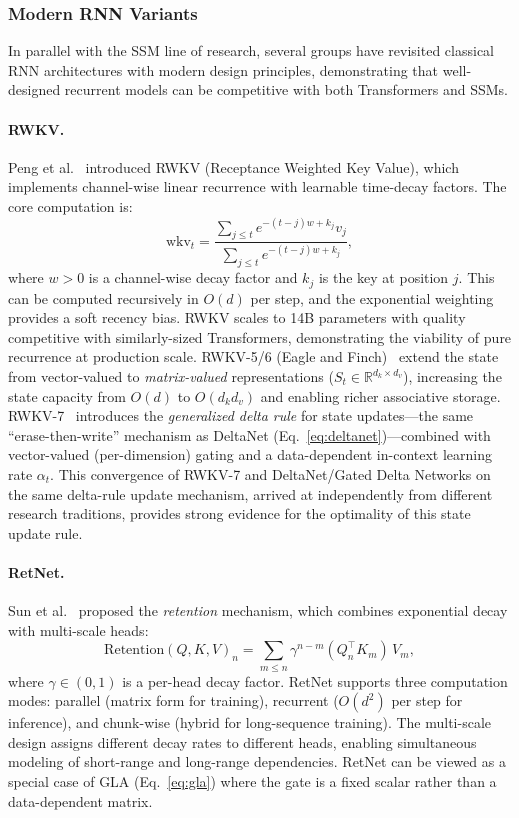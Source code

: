 \subsubsection{Modern RNN Variants}
\label{subsubsec:modern-rnn}

In parallel with the SSM line of research, several groups have revisited classical RNN architectures with modern design principles, demonstrating that well-designed recurrent models can be competitive with both Transformers and SSMs.

\paragraph{RWKV.}
Peng et al.~\cite{peng2023rwkv} introduced RWKV (Receptance Weighted Key Value), which implements channel-wise linear recurrence with learnable time-decay factors. The core computation is:
\begin{equation}
\text{wkv}_t = \frac{\sum_{j \leq t} e^{-(t-j)w + k_j} v_j}{\sum_{j \leq t} e^{-(t-j)w + k_j}},
\label{eq:rwkv}
\end{equation}
where $w > 0$ is a channel-wise decay factor and $k_j$ is the key at position $j$. This can be computed recursively in $O(d)$ per step, and the exponential weighting provides a soft recency bias. RWKV scales to 14B parameters with quality competitive with similarly-sized Transformers, demonstrating the viability of pure recurrence at production scale. RWKV-5/6 (Eagle and Finch)~\cite{peng2024eagle} extend the state from vector-valued to \emph{matrix-valued} representations ($S_t \in \mathbb{R}^{d_k \times d_v}$), increasing the state capacity from $O(d)$ to $O(d_k d_v)$ and enabling richer associative storage. RWKV-7~\cite{peng2025rwkv7} introduces the \emph{generalized delta rule} for state updates---the same ``erase-then-write'' mechanism as DeltaNet (Eq.~\ref{eq:deltanet})---combined with vector-valued (per-dimension) gating and a data-dependent in-context learning rate $\alpha_t$. This convergence of RWKV-7 and DeltaNet/Gated Delta Networks on the same delta-rule update mechanism, arrived at independently from different research traditions, provides strong evidence for the optimality of this state update rule.

\paragraph{RetNet.}
Sun et al.~\cite{sun2023retentive} proposed the \emph{retention} mechanism, which combines exponential decay with multi-scale heads:
\begin{equation}
\text{Retention}(Q, K, V)_n = \sum_{m \leq n} \gamma^{n-m} (Q_n^\top K_m)\, V_m,
\label{eq:retnet}
\end{equation}
where $\gamma \in (0, 1)$ is a per-head decay factor. RetNet supports three computation modes: parallel (matrix form for training), recurrent ($O(d^2)$ per step for inference), and chunk-wise (hybrid for long-sequence training). The multi-scale design assigns different decay rates to different heads, enabling simultaneous modeling of short-range and long-range dependencies. RetNet can be viewed as a special case of GLA (Eq.~\ref{eq:gla}) where the gate is a fixed scalar rather than a data-dependent matrix.

